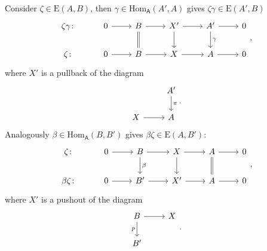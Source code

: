 \begin{rem}[]
	Consider $\zeta \in \mathrm{E}(A,B)$,
	then $\gamma \in \mathrm{Hom}_{\mathsf{A}} \left( A', A \right)$
	gives $\zeta\gamma \in \mathrm{E}(A',B)$
	\begin{equation}
	\begin{tikzcd}
		\zeta\gamma\colon &
		0 \arrow[r, "", rightarrow] &
		B \arrow[r, "", rightarrow] \arrow[d, "", equal] &
		X' \arrow[r, "", rightarrow] \arrow[d, "", rightarrow] &
		A' \arrow[r, "", rightarrow] \arrow[d, "\gamma", rightarrow] &
		0\\
		\zeta\colon &
		0 \arrow[r, "", rightarrow] &
		B \arrow[r, "", rightarrow] &
		X \arrow[r, "", rightarrow] &
		A \arrow[r, "", rightarrow] &
		0
	\end{tikzcd}
	,\end{equation} 
	where $X'$ is a pullback of the diagram
	\begin{equation}
	\begin{tikzcd}
		& A' \arrow[d, "\pi", rightarrow] \\
		X \arrow[r, "", rightarrow] & A
	\end{tikzcd}
	.\end{equation} 
	Analogously $\beta \in \mathrm{Hom}_{\mathsf{A}} \left( B, B' \right)$ gives
	$\beta\zeta \in \mathrm{E}(A,B')$:
	\begin{equation}
	\begin{tikzcd}
		\zeta\colon &
		0 \arrow[r, "", rightarrow] &
		B \arrow[r, "", rightarrow] \arrow[d, "\beta", rightarrow] &
		X \arrow[r, "", rightarrow] \arrow[d, "", rightarrow] &
		A \arrow[r, "", rightarrow] \arrow[d, "", equal] &
		0\\
		\beta\zeta\colon &
		0 \arrow[r, "", rightarrow] &
		B' \arrow[r, "", rightarrow] &
		X' \arrow[r, "", rightarrow] &
		A \arrow[r, "", rightarrow] &
		0
	\end{tikzcd}
	,\end{equation} 
	where $X'$ is a pushout of the diagram
	\begin{equation}
	\begin{tikzcd}
		B \arrow[r, "", rightarrow] \arrow[d, "p"', rightarrow] & X\\
		B' &
	\end{tikzcd}
	.\end{equation} 
\end{rem}


